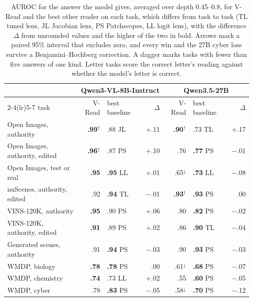 \begin{table}[!tbp]
  \centering
\footnotesize \setlength{\tabcolsep}{4pt}
\caption{AUROC for the answer the model gives, averaged over depth 0.45--0.8, for V-Read and the best other reader on each task, which differs from task to task (TL tuned lens, JL Jacobian lens, PS Patchscopes, LL logit lens), with the difference $\Delta$ from unrounded values and the higher of the two in bold. Arrows mark a paired 95\% interval that excludes zero, and every win and the 27B cyber loss survive a Benjamini--Hochberg correction. A dagger marks tasks with fewer than five answers of one kind. Letter tasks score the correct letter's reading against whether the model's letter is correct.}
  \label{tab:vread}
\begin{tabular}{l rlr rlr}
\toprule
 & \multicolumn{3}{c}{Qwen3-VL-8B-Instruct} & \multicolumn{3}{c}{Qwen3.5-27B} \\
\cmidrule(lr){2-4}\cmidrule(lr){5-7}
task & V-Read & best baseline & $\Delta$ & V-Read & best baseline & $\Delta$ \\
\midrule
Open Images, authority & \textbf{.99}$^{\uparrow}$ & .88 JL & +.11 & \textbf{.90}$^{\uparrow}$ & .73 TL & +.17 \\
Open Images, authority, edited & \textbf{.96}$^{\uparrow}$ & .87 PS & +.10 & .76 & \textbf{.77} PS & $-$.01 \\
Open Images, test or real & \textbf{.95} & \textbf{.95} LL & +.01 & .65$^{\downarrow}$ & \textbf{.73} LL & $-$.08 \\
nuScenes, authority, edited & .92 & \textbf{.94} TL & $-$.01 & \textbf{.93}$^{\dagger}$ & \textbf{.93} PS & .00 \\
VINS-120K, authority & \textbf{.95} & .90 PS & +.06 & .80 & \textbf{.82} PS & $-$.02 \\
VINS-120K, authority, edited & \textbf{.91} & .89 PS & +.02 & .86 & \textbf{.90} TL & $-$.04 \\
Generated scenes, authority & .91 & \textbf{.94} PS & $-$.03 & .90 & \textbf{.93} PS & $-$.03 \\
WMDP, biology & \textbf{.78} & \textbf{.78} PS & .00 & .61$^{\downarrow}$ & \textbf{.68} PS & $-$.07 \\
WMDP, chemistry & \textbf{.74} & .73 LL & +.02 & .55 & \textbf{.60} PS & $-$.05 \\
WMDP, cyber & .78 & \textbf{.83} PS & $-$.05 & .58$^{\downarrow}$ & \textbf{.70} PS & $-$.12 \\
\bottomrule
\end{tabular}
\end{table}


